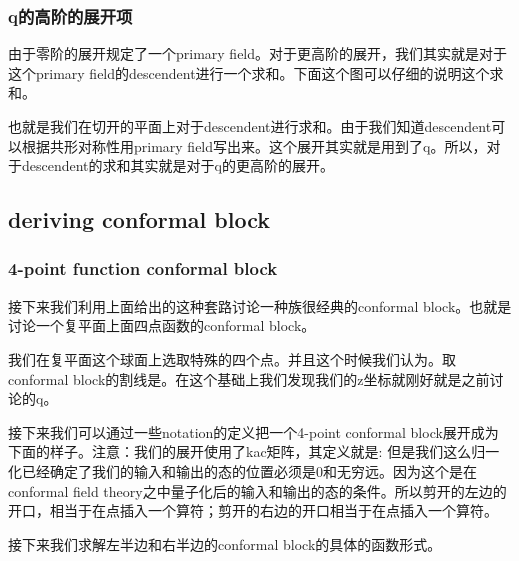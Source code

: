 \subsubsection{q的高阶的展开项}
由于零阶的展开规定了一个primary field。对于更高阶的展开，我们其实就是对于这个primary field的descendent进行一个求和。下面这个图可以仔细的说明这个求和。

也就是我们在切开的平面上对于descendent进行求和。由于我们知道descendent可以根据共形对称性用primary field写出来。这个展开其实就是用到了q。所以，对于descendent的求和其实就是对于q的更高阶的展开。

\subsection{deriving conformal block}
\subsubsection{4-point function conformal block}
接下来我们利用上面给出的这种套路讨论一种族很经典的conformal block。也就是讨论一个复平面上面四点函数的conformal block。

我们在复平面这个球面上选取特殊的四个点。并且这个时候我们认为。取conformal block的割线是\seq{z \in (-\infty,0]\cup [1,\infty)}。在这个基础上我们发现我们的z坐标就刚好就是之前讨论的q。

接下来我们可以通过一些notation的定义把一个4-point conformal block展开成为下面的样子。注意：我们的展开使用了kac矩阵，其定义就是:
但是我们这么归一化已经确定了我们的输入和输出的态的位置必须是0和无穷远。因为这个是在conformal field theory之中量子化后的输入和输出的态的条件。所以剪开的左边的开口，相当于在\seq{\infty}点插入一个算符；剪开的右边的开口相当于在点插入一个算符。

接下来我们求解左半边和右半边的conformal block的具体的函数形式。

